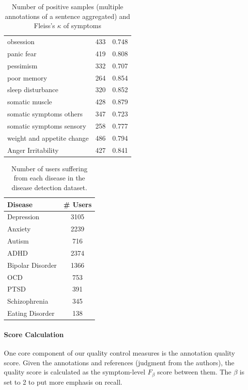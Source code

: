 \begin{table}[ht]
\begin{tabular}{m{4.8cm}m{0.9cm}m{0.9cm}}
    obsession	&	433	&	0.748 	\\
    panic fear	&	419	&	0.808 	\\
    pessimism	&	332	&	0.707 	\\
    poor memory	&	264	&	0.854 	\\
    sleep disturbance	&	320	&	0.852 	\\
    somatic muscle	&	428	&	0.879 	\\
    somatic symptoms others	&	347	&	0.723 	\\
    somatic symptoms sensory	&	258	&	0.777 	\\
    weight and appetite change	&	486	&	0.794 	\\
    Anger Irritability	&	427	&	0.841 	\\
    \hline
    \end{tabular}
    \caption{Number of positive samples (multiple annotations of a sentence aggregated) and Fleiss's $\kappa$ of symptoms}
    \label{tab:symp_count}
\end{table}


\begin{table}[h]
    \small
    \centering
    \begin{tabular}{lc}
    \hline
    Disease          & \# Users \\
    \hline
    Depression       & 3105         \\
    Anxiety          & 2239         \\
    Autism           & 716         \\
    ADHD             & 2374         \\
    Bipolar Disorder & 1366         \\
    OCD              & 753          \\
    PTSD             & 391          \\
    Schizophrenia    & 345          \\
    Eating Disorder  & 138          \\
    \hline
    \end{tabular}
    \caption{Number of users suffering from each disease in the disease detection dataset.}
    \label{tab:disease_detect_count}
\end{table}

\paragraph{Score Calculation} One core component of our quality control measures is the annotation quality score. Given the annotations and references (judgment from the authors), the quality score is calculated as the symptom-level $F_{\beta}$ score between them. The $\beta$ is set to 2 to put more emphasis on recall. 

